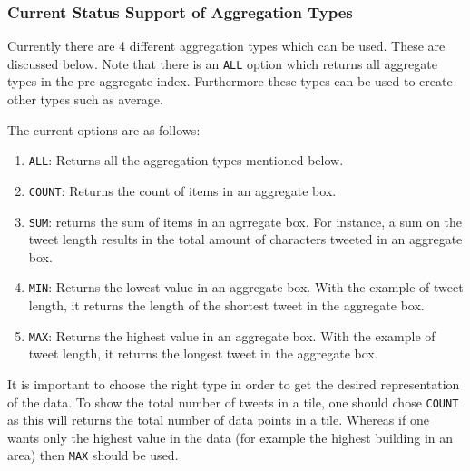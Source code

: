 \subsubsection{Current Status Support of Aggregation Types}

Currently there are 4 different aggregation types which can be used. These
are discussed below. Note that there is an \lstinline|ALL| option which
returns all aggregate types in the pre-aggregate index. Furthermore these
types can be used to create other types such as average.

The current options are as follows:
\begin{enumerate}
\item \lstinline|ALL|: 	Returns all the aggregation types mentioned below.
\item \lstinline|COUNT|: Returns the count of items in an aggregate box.
\item \lstinline|SUM|: returns the sum of items in an agrregate box.
	For instance, a sum on the tweet length results in the total amount
	of characters tweeted in an aggregate box.
\item \lstinline|MIN|: Returns the lowest value in an aggregate box.
	With the example of tweet length, it returns the length of the shortest
	tweet in the aggregate box.
\item \lstinline|MAX|: Returns the highest value in an aggregate box.
	With the example of tweet length, it returns the longest tweet in the
	aggregate box.
\end{enumerate}


It is important to choose the right type in order to get the desired
representation of the data.  To show the total number of tweets in a tile,
one should chose \lstinline|COUNT| as this will returns the total number of
data points in a tile. Whereas if one wants only the highest value in the
data (for example the highest building in an area) then \lstinline|MAX|
should be used.
